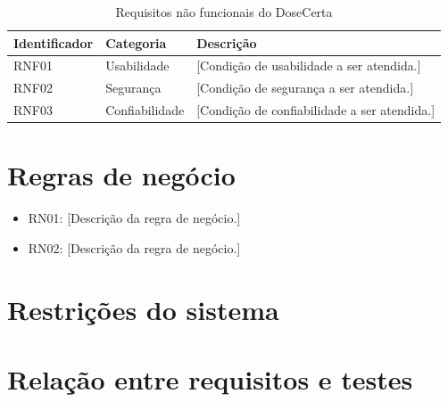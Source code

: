 
\begin{table}[htbp]
    \centering
    \caption{Requisitos não funcionais do DoseCerta}
    \label{tab:requisitos_nao_funcionais}
    \begin{tabular}{|p{2cm}|p{3cm}|p{8cm}|}
        \hline
        \textbf{Identificador} &
        \textbf{Categoria} &
        \textbf{Descrição} \\
        \hline
        RNF01 & Usabilidade & [Condição de usabilidade a ser atendida.] \\
        \hline
        RNF02 & Segurança & [Condição de segurança a ser atendida.] \\
        \hline
        RNF03 & Confiabilidade & [Condição de confiabilidade a ser atendida.] \\
        \hline
    \end{tabular}
\end{table}

\section{Regras de negócio}
\label{sec:regras_negocio}


\begin{itemize}
    \item RN01: [Descrição da regra de negócio.]
    \item RN02: [Descrição da regra de negócio.]
\end{itemize}

\section{Restrições do sistema}
\label{sec:restricoes}


\section{Relação entre requisitos e testes}
\label{sec:requisitos_testes}

